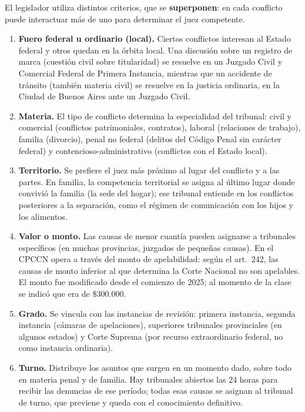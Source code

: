 \documentclass[12pt,oneside]{book}
\begin{document}
El legislador utiliza distintos criterios, que se \textbf{superponen}: en cada conflicto puede interactuar más de uno para determinar el juez competente.

\begin{enumerate}
\item \textbf{Fuero federal u ordinario (local).} Ciertos conflictos interesan al Estado federal y otros quedan en la órbita local. Una discusión sobre un registro de marca (cuestión civil sobre titularidad) se resuelve en un Juzgado Civil y Comercial Federal de Primera Instancia, mientras que un accidente de tránsito (también materia civil) se resuelve en la justicia ordinaria, en la Ciudad de Buenos Aires ante un Juzgado Civil.
\item \textbf{Materia.} El tipo de conflicto determina la especialidad del tribunal: civil y comercial (conflictos patrimoniales, contratos), laboral (relaciones de trabajo), familia (divorcio), penal no federal (delitos del Código Penal sin carácter federal) y contencioso-administrativo (conflictos con el Estado local).
\item \textbf{Territorio.} Se prefiere el juez más próximo al lugar del conflicto y a las partes. En familia, la competencia territorial se asigna al último lugar donde convivió la familia (la sede del hogar); ese tribunal entiende en los conflictos posteriores a la separación, como el régimen de comunicación con los hijos y los alimentos.
\item \textbf{Valor o monto.} Las causas de menor cuantía pueden asignarse a tribunales específicos (en muchas provincias, juzgados de pequeñas causas). En el CPCCN opera a través del monto de apelabilidad: según el art.~242, las causas de monto inferior al que determina la Corte Nacional no son apelables. El monto fue modificado desde el comienzo de 2025; al momento de la clase se indicó que era de \$300.000.
\item \textbf{Grado.} Se vincula con las instancias de revisión: primera instancia, segunda instancia (cámaras de apelaciones), superiores tribunales provinciales (en algunos estados) y Corte Suprema (por recurso extraordinario federal, no como instancia ordinaria).
\item \textbf{Turno.} Distribuye los asuntos que surgen en un momento dado, sobre todo en materia penal y de familia. Hay tribunales abiertos las 24 horas para recibir las denuncias de ese período; todas esas causas se asignan al tribunal de turno, que previene y queda con el conocimiento definitivo.
\end{enumerate}
\end{document}

